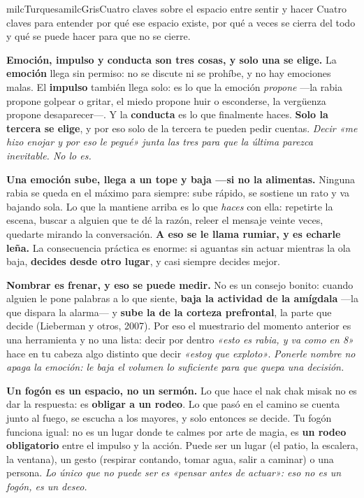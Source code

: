 \documentclass[11pt,letterpaper]{article}
\newcommand{\milcpaso}[3]{%
\Needspace{4\baselineskip}%
\begin{tcolorbox}[enhanced,colback=white,colframe=milcLinea,arc=1.5mm,boxrule=.9pt,
  left=14mm,right=4mm,top=3mm,bottom=3mm,before skip=4pt,after skip=4pt,
  fontupper=\RaggedRight,
  overlay={\node[anchor=north west,circle,fill=#2,text=white,inner sep=0pt,
    minimum size=7.4mm,font=\sffamily\bfseries\small]
    at ([xshift=3.6mm,yshift=-3.2mm]frame.north west) {#1};}]
#3
\end{tcolorbox}}
\begin{document}
\begin{softbox}{milcTurquesa}{milcGris}{Cuatro claves sobre el espacio entre sentir y hacer}
Cuatro claves para entender por qué ese espacio existe, por qué a veces se cierra del todo y qué se puede hacer para que no se cierre.
\end{softbox}

\milcpaso{1}{milcTurquesa}{\textbf{Emoción, impulso y conducta son tres cosas, y solo una se elige.} La \textbf{emoción} llega sin permiso: no se discute ni se prohíbe, y no hay emociones malas. El \textbf{impulso} también llega solo: es lo que la emoción \emph{propone} ---la rabia propone golpear o gritar, el miedo propone huir o esconderse, la vergüenza propone desaparecer---. Y la \textbf{conducta} es lo que finalmente haces. \textbf{Solo la tercera se elige}, y por eso solo de la tercera te pueden pedir cuentas. \emph{Decir «me hizo enojar y por eso le pegué» junta las tres para que la última parezca inevitable. No lo es.}}
\milcpaso{2}{milcTurquesa}{\textbf{Una emoción sube, llega a un tope y baja ---si no la alimentas.} Ninguna rabia se queda en el máximo para siempre: sube rápido, se sostiene un rato y va bajando sola. Lo que la mantiene arriba es lo que \emph{haces} con ella: repetirte la escena, buscar a alguien que te dé la razón, releer el mensaje veinte veces, quedarte mirando la conversación. \textbf{A eso se le llama rumiar, y es echarle leña.} La consecuencia práctica es enorme: si aguantas sin actuar mientras la ola baja, \textbf{decides desde otro lugar}, y casi siempre decides mejor.}
\milcpaso{3}{milcTurquesa}{\textbf{Nombrar es frenar, y eso se puede medir.} No es un consejo bonito: cuando alguien le pone palabras a lo que siente, \textbf{baja la actividad de la amígdala} ---la que dispara la alarma--- y \textbf{sube la de la corteza prefrontal}, la parte que decide (Lieberman y otros, 2007). Por eso el muestrario del momento anterior es una herramienta y no una lista: decir por dentro \emph{«esto es rabia, y va como en 8»} hace en tu cabeza algo distinto que decir \emph{«estoy que exploto»}. \emph{Ponerle nombre no apaga la emoción: le baja el volumen lo suficiente para que quepa una decisión.}}
\milcpaso{4}{milcTurquesa}{\textbf{Un fogón es un espacio, no un sermón.} Lo que hace el nak chak misak no es dar la respuesta: es \textbf{obligar a un rodeo}. Lo que pasó en el camino se cuenta junto al fuego, se escucha a los mayores, y solo entonces se decide. Tu fogón funciona igual: no es un lugar donde te calmes por arte de magia, es \textbf{un rodeo obligatorio} entre el impulso y la acción. Puede ser un lugar (el patio, la escalera, la ventana), un gesto (respirar contando, tomar agua, salir a caminar) o una persona. \emph{Lo único que no puede ser es «pensar antes de actuar»: eso no es un fogón, es un deseo.}}
\end{document}
